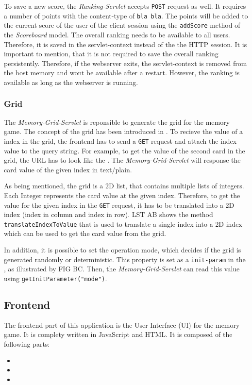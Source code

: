To save a new score, the \textit{Ranking-Servlet} accepts \texttt{POST} request as well. It requires a number of points with the content-type of \texttt{bla bla}.
The points will be added to the current score of the user of the client session using the \texttt{addScore} method of the \textit{Scoreboard} model.
The overall ranking needs to be available to all users. Therefore, it is saved in the servlet-context instead of the the HTTP session.
It is important to mention, that it is not required to save the overall ranking persistently. Therefore, if the webserver exits, the servlet-context is removed from the host memory and wont be available after a restart. However, the ranking is available as long as the webserver is running.

\subsubsection{Grid}\label{subsubsec:03_impl_backend_grid}
The \textit{Memory-Grid-Servlet} is reponsible to generate the grid for the memory game. The concept of the grid has been introduced in .
To recieve the value of a index in the grid, the frontend has to send a \texttt{GET} request and attach the index value to the query string. For example, to get the value of the second card in the grid, the URL has to look like the .
The \textit{Memory-Grid-Servlet} will response the card value of the given index in text/plain.

As being mentioned, the grid is a 2D list, that contains multiple lists of integers. Each Integer represents the card value at the given index. Therefore, to get the value for the given index in the \texttt{GET} request, it has to be translated into a 2D index (index in column and index in row). LST AB shows the method \texttt{translateIndexToValue} that is used to translate a single index into a 2D index which can be used to get the card value from the grid.

In addition, it is possible to set the operation mode, which decides if the grid is generated randomly or deterministic. This property is set as a \texttt{init-param} in the , as illustrated by FIG BC. Then, the \textit{Memory-Grid-Servlet} can read this value using \texttt{getInitParameter("mode")}.


\subsection{Frontend}\label{subsec:03_impl_frontend}
The frontend part of this application is the User Interface (UI) for the memory game. It is complety written in JavaScript and HTML.
%
It is composed of the following parts:
\begin{itemize}
\item {}
\item {}
\item {}
\end{itemize}

